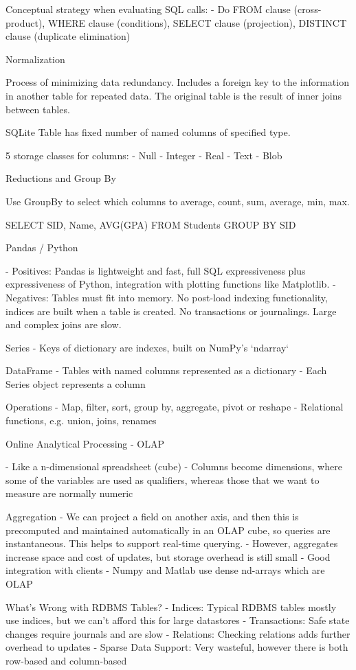 \documentclass[3pt,landscape]{article}
\begin{document}
\begin{multicols}{3}
Conceptual strategy when evaluating SQL calls:
- Do FROM clause (cross-product), WHERE clause (conditions), SELECT clause (projection), DISTINCT clause (duplicate elimination)

Normalization

Process of minimizing data redundancy. Includes a foreign key to the information in another table for repeated data. The original table is the result of inner joins between tables.

SQLite
Table has fixed number of named columns of specified type.

5 storage classes for columns:
- Null
- Integer
- Real
- Text
- Blob

Reductions and Group By

Use GroupBy to select which columns to average, count, sum, average, min, max.

    SELECT SID, Name, AVG(GPA)
     FROM Students
     GROUP BY SID
 

Pandas / Python

- Positives: Pandas is lightweight and fast, full SQL expressiveness plus expressiveness of Python, integration with plotting functions like Matplotlib.
- Negatives: Tables must fit into memory. No post-load indexing functionality, indices are built when a table is created. No transactions or journalings. Large and complex joins are slow.

Series
- Keys of dictionary are indexes, built on NumPy’s `ndarray`

DataFrame
- Tables with named columns represented as a dictionary
- Each Series object represents a column

Operations
- Map, filter, sort, group by, aggregate, pivot or reshape
- Relational functions, e.g. union, joins, renames

Online Analytical Processing - OLAP

- Like a n-dimensional spreadsheet (cube)
- Columns become dimensions, where some of the variables are used as qualifiers, whereas those that we want to measure are normally numeric


Aggregation
- We can project a field on another axis, and then this is precomputed and maintained automatically in an OLAP cube, so queries are instantaneous. This helps to support real-time querying.
- However, aggregates increase space and cost of updates, but storage overhead is still small
- Good integration with clients
- Numpy and Matlab use dense nd-arrays which are OLAP


What’s Wrong with RDBMS Tables?
- Indices: Typical RDBMS tables mostly use indices, but we can’t afford this for large datastores
- Transactions: Safe state changes require journals and are slow
- Relations: Checking relations adds further overhead to updates
- Sparse Data Support: Very wasteful, however there is both row-based and column-based


\end{multicols}
\end{document}

